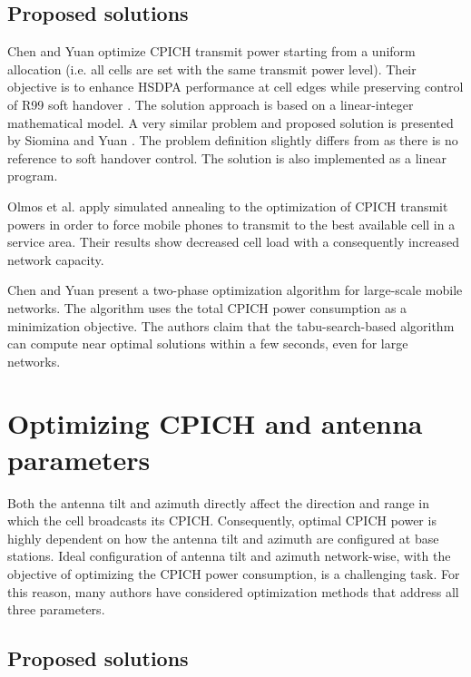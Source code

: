 \subsection{Proposed solutions}

Chen and Yuan \cite{CPICH.optimization:2008} optimize CPICH transmit
power starting from a uniform allocation (i.e. all cells are set with
the same transmit power level). Their objective is to enhance HSDPA
performance at cell edges while preserving control of R99 soft handover
\cite{wiki:soft_handover}. The solution approach is based on a linear-integer
mathematical model. A very similar problem and proposed solution is
presented by Siomina and Yuan \cite{CPICH.optimization:2007}. The
problem definition slightly differs from \cite{CPICH.optimization:2008}
as there is no reference to soft handover control. The solution is
also implemented as a linear program.

Olmos et al. \cite{CPICH.optimization:2003} apply simulated annealing
to the optimization of CPICH transmit powers in order to force mobile
phones to transmit to the best available cell in a service area. Their
results show decreased cell load with a consequently increased network
capacity.

Chen and Yuan \cite{CPICH.optimization:2009} present a two-phase
optimization algorithm for large-scale mobile networks. The algorithm
uses the total CPICH power consumption as a minimization objective.
The authors claim that the tabu-search-based algorithm can compute
near optimal solutions within a few seconds, even for large networks.


\section{Optimizing CPICH and antenna parameters}

Both the antenna tilt and azimuth directly affect the direction and
range in which the cell broadcasts its CPICH. Consequently, optimal
CPICH power is highly dependent on how the antenna tilt and azimuth
are configured at base stations. Ideal configuration of antenna tilt
and azimuth network-wise, with the objective of optimizing the CPICH
power consumption, is a challenging task. For this reason, many authors
have considered optimization methods that address all three parameters.


\subsection{Proposed solutions}

